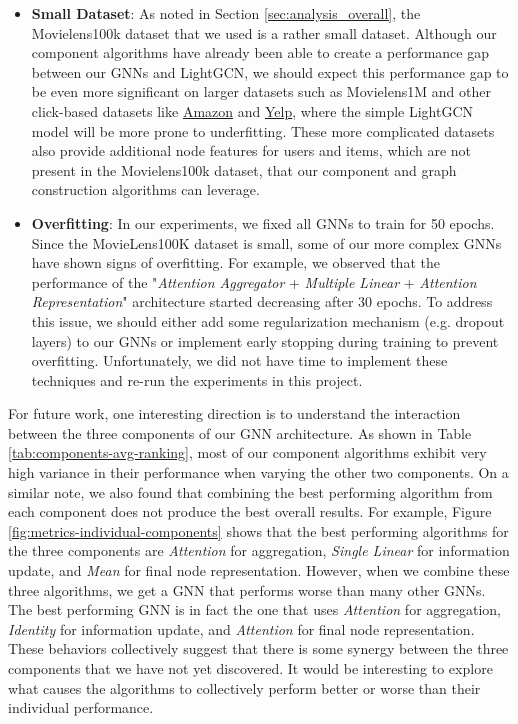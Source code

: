 \documentclass{article}
\begin{document}
\begin{itemize}
    \item \textbf{Small Dataset}: As noted in Section \ref{sec:analysis_overall}, the Movielens100k dataset that we used is a rather small dataset. Although our component algorithms have already been able to create a performance gap between our GNNs and LightGCN, we should expect this performance gap to be even more significant on larger datasets such as Movielens1M and other click-based datasets like \href{http://jmcauley.ucsd.edu/data/amazon/links.html}{Amazon} and \href{https://www.yelp.com/dataset}{Yelp}, where the simple LightGCN model will be more prone to underfitting. These more complicated datasets also provide additional node features for users and items, which are not present in the Movielens100k dataset, that our component and graph construction algorithms can leverage.
    \item \textbf{Overfitting}: In our experiments, we fixed all GNNs to train for 50 epochs. Since the MovieLens100K dataset is small, some of our more complex GNNs have shown signs of overfitting. For example, we observed that the performance of the "\textit{Attention Aggregator} + \textit{Multiple Linear} + \textit{Attention Representation}" architecture started decreasing after 30 epochs. To address this issue, we should either add some regularization mechanism (e.g. dropout layers) to our GNNs or implement early stopping during training to prevent overfitting. Unfortunately, we did not have time to implement these techniques and re-run the experiments in this project.
\end{itemize}

For future work, one interesting direction is to understand the interaction between the three components of our GNN architecture. As shown in Table \ref{tab:components-avg-ranking}, most of our component algorithms exhibit very high variance in their performance when varying the other two components. On a similar note, we also found that combining the best performing algorithm from each component does not produce the best overall results. For example, Figure \ref{fig:metrics-individual-components} shows that the best performing algorithms for the three components are \textit{Attention} for aggregation, \textit{Single Linear} for information update, and \textit{Mean} for final node representation. However, when we combine these three algorithms, we get a GNN that performs worse than many other GNNs. The best performing GNN is in fact the one that uses \textit{Attention} for aggregation, \textit{Identity} for information update, and \textit{Attention} for final node representation. These behaviors collectively suggest that there is some synergy between the three components that we have not yet discovered. It would be interesting to explore what causes the algorithms to collectively perform better or worse than their individual performance.
\end{document}
